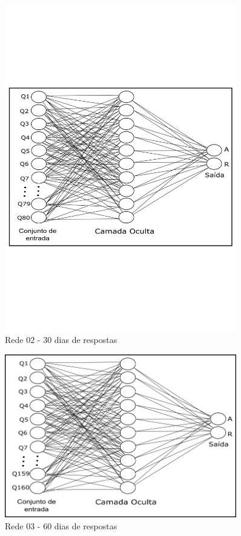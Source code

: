 \documentclass[
	12pt,				%
	openright,			%
	oneside,
	a4paper,			%
	english,			%
	french,				%
	spanish,			%
	brazil,				%
	]{abntex2}
\begin{document}
\begin{figure}
    \centering
    \includegraphics[width=0.9\textwidth]{Modelo_Projeto_Pesquisa_UFG_REJ_BCC/rede02_30.png}
    \caption{Rede 02 - 30 dias de respostas}
    \label{fig:rede02}
\end{figure}

\begin{figure}
    \centering
    \includegraphics[width=0.9\textwidth]{Modelo_Projeto_Pesquisa_UFG_REJ_BCC/rede03_60.png}
    \caption{Rede 03 - 60 dias de respostas}
    \label{fig:rede03}
\end{figure}
\end{document}
